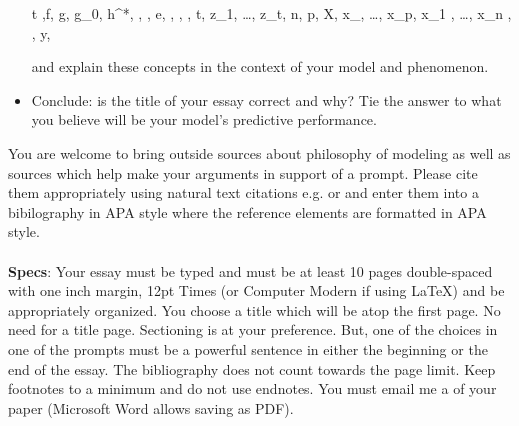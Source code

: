 \documentclass[12pt]{article}
\begin{document}
\begin{itemize}
\beqn
t ,f, g, g_0, h^*, \delta, , e, , , , t, z_1, \ldots, z_t, n, p, X, x_{}, \ldots, x_{\cdot p}, x_{1 \cdot}, \ldots, x_{n \cdot}, , y, 
\eeqn

and explain these concepts in the context of your model and phenomenon.

\item Conclude: is the title of your essay correct and why? Tie the answer to what you believe will be your  model's predictive performance.
\end{itemize}
%
%
%

You are welcome to bring outside sources about philosophy of modeling as well as sources which help make your arguments in support of a prompt. Please cite them appropriately using natural text citations e.g.  or  and enter them into a bibilography in APA style where the reference elements are formatted in APA style.\\
~\\
\textbf{Specs}: Your essay must be typed and must be at least 10 pages double-spaced with one inch margin, 12pt Times (or Computer Modern if using \LaTeX) and be appropriately organized. You choose a title which will be atop the first page. No need for a title page. Sectioning is at your preference. But, one of the choices in one of the prompts must be a powerful sentence in either the beginning or the end of the essay. The bibliography does not count towards the page limit. Keep footnotes to a minimum and do not use endnotes. You must email me a   of your paper (Microsoft Word allows saving as PDF).
\end{document}
